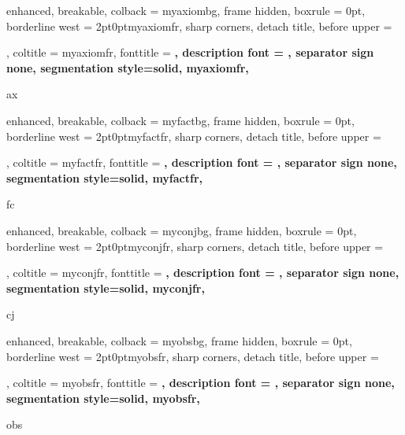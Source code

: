 {%
  enhanced,
  breakable,
  colback = myaxiombg,
  frame hidden,
  boxrule = 0pt,
  borderline west = {2pt}{0pt}{myaxiomfr},
  sharp corners,
  detach title,
  before upper = \tcbtitle\par\smallskip,
  coltitle = myaxiomfr,
  fonttitle = \bfseries\sffamily,
  description font = \mdseries,
  separator sign none,
  segmentation style={solid, myaxiomfr},
}{ax}

{%
  enhanced,
  breakable,
  colback = myfactbg,
  frame hidden,
  boxrule = 0pt,
  borderline west = {2pt}{0pt}{myfactfr},
  sharp corners,
  detach title,
  before upper = \tcbtitle\par\smallskip,
  coltitle = myfactfr,
  fonttitle = \bfseries\sffamily,
  description font = \mdseries,
  separator sign none,
  segmentation style={solid, myfactfr},
}{fc}

{%
  enhanced,
  breakable,
  colback = myconjbg,
  frame hidden,
  boxrule = 0pt,
  borderline west = {2pt}{0pt}{myconjfr},
  sharp corners,
  detach title,
  before upper = \tcbtitle\par\smallskip,
  coltitle = myconjfr,
  fonttitle = \bfseries\sffamily,
  description font = \mdseries,
  separator sign none,
  segmentation style={solid, myconjfr},
}{cj}

{%
  enhanced,
  breakable,
  colback = myobsbg,
  frame hidden,
  boxrule = 0pt,
  borderline west = {2pt}{0pt}{myobsfr},
  sharp corners,
  detach title,
  before upper = \tcbtitle\par\smallskip,
  coltitle = myobsfr,
  fonttitle = \bfseries\sffamily,
  description font = \mdseries,
  separator sign none,
  segmentation style={solid, myobsfr},
}{obs}


